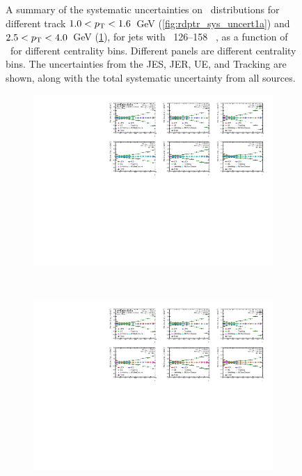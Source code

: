 \begin{figure}
\begin{subfigure}[b]{\textwidth}
    \caption{}
    \label{fig:rdptr_sys_uncert1b}
\end{subfigure}\hfill
   \caption{A summary of the systematic uncertainties on \RDptr\ distributions for different track \mbox{$1.0 < \mbox{$p_{\mathrm{T}}$} < 1.6$ GeV} (\ref{fig:rdptr_sys_uncert1a}) and \mbox{$2.5 < \mbox{$p_{\mathrm{T}}$} < 4.0$ GeV} (\ref{fig:rdptr_sys_uncert1b}), for jets with \pt\ 126--158 \GeV\ , as a function of \rvar\ for different centrality bins. Different panels are different centrality bins. The uncertainties from the JES, JER, UE, and Tracking  are shown, along with the total systematic uncertainty from all sources. }
\label{fig:rdptr_sys_uncert1}
\end{figure}


\begin{figure}
\centering
\begin{subfigure}[b]{\textwidth}
    \centering
    \includegraphics[page=5, width=\textwidth]{figures/main/systematics/Summary_ChPS_dR_sys_PbPb_error}
    \caption{}
    \label{fig:rdptr_sys_uncert2a}
\end{subfigure} \\
\begin{subfigure}[b]{\textwidth}
    \centering
    \includegraphics[page=6, width=\textwidth]{figures/main/systematics/Summary_ChPS_dR_sys_PbPb_error}

\end{subfigure}
\end{figure}
